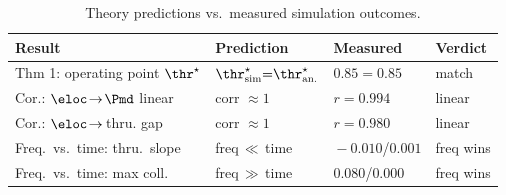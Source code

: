 \begin{table}[t]
\centering
\caption{Theory predictions vs.\ measured simulation outcomes.}
\label{tab:theory_sim}
\renewcommand{\arraystretch}{1.2}
\begin{tabular}{@{}p{2.9cm} p{1.55cm} p{1.55cm} p{1.3cm}@{}}
\toprule
Result & Prediction & Measured & Verdict\\
\midrule
Thm 1: operating point $\thr^\star$ & $\thr^\star_{\text{sim}}{=}\thr^\star_{\text{an.}}$ & $0.85=0.85$ & match\\
Cor.: $\eloc\!\to\!\Pmd$ linear & corr $\approx 1$ & $r=0.994$ & linear\\
Cor.: $\eloc\!\to\!$ thru. gap & corr $\approx 1$ & $r=0.980$ & linear\\
Freq.\ vs.\ time: thru.\ slope & freq\,$\ll$\,time & $\!-0.010$/$0.001$ & freq wins\\
Freq.\ vs.\ time: max coll. & freq\,$\gg$\,time & $0.080$/$0.000$ & freq wins\\
\bottomrule
\end{tabular}
\end{table}
